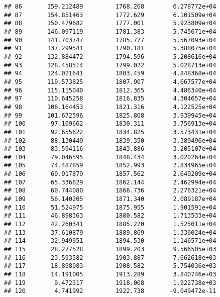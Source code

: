 \documentclass[]{article}
\begin{document}
\begin{verbatim}
## 86       159.212489         1768.268        6.278772e+04
## 87       154.851463         1772.629        6.101509e+04
## 88       150.479682         1777.001        5.923809e+04
## 89       146.097119         1781.383        5.745671e+04
## 90       141.703747         1785.777        5.567093e+04
## 91       137.299541         1790.181        5.388075e+04
## 92       132.884472         1794.596        5.208616e+04
## 93       128.458514         1799.022        5.028713e+04
## 94       124.021641         1803.459        4.848368e+04
## 95       119.573825         1807.907        4.667577e+04
## 96       115.115040         1812.365        4.486340e+04
## 97       110.645258         1816.835        4.304657e+04
## 98       106.164453         1821.316        4.122525e+04
## 99       101.672596         1825.808        3.939945e+04
## 100       97.169662         1830.311        3.756913e+04
## 101       92.655622         1834.825        3.573431e+04
## 102       88.130449         1839.350        3.389496e+04
## 103       83.594116         1843.886        3.205107e+04
## 104       79.046595         1848.434        3.020264e+04
## 105       74.487859         1852.993        2.834965e+04
## 106       69.917879         1857.562        2.649209e+04
## 107       65.336629         1862.144        2.462994e+04
## 108       60.744080         1866.736        2.276321e+04
## 109       56.140205         1871.340        2.089187e+04
## 110       51.524975         1875.955        1.901591e+04
## 111       46.898363         1880.582        1.713533e+04
## 112       42.260341         1885.220        1.525011e+04
## 113       37.610879         1889.869        1.336024e+04
## 114       32.949951         1894.530        1.146571e+04
## 115       28.277528         1899.203        9.566505e+03
## 116       23.593582         1903.887        7.662618e+03
## 117       18.898083         1908.582        5.754036e+03
## 118       14.191005         1913.289        3.840746e+03
## 119        9.472317         1918.008        1.922738e+03
## 120        4.741992         1922.738       -9.049472e-11
\end{verbatim}
\end{document}
